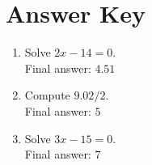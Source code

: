 \documentclass[12pt]{article}
\begin{document}
\section*{Answer Key}

\begin{enumerate}
  \item Solve $2x - 14 = 0$.\\
        Final answer: $\boxed{4.51}$
  \item Compute $9.02 / 2$.\\
        Final answer: $\boxed{5}$
  \item Solve $3x - 15 = 0$.\\
        Final answer: $\boxed{7}$
\end{enumerate}
\end{document}
